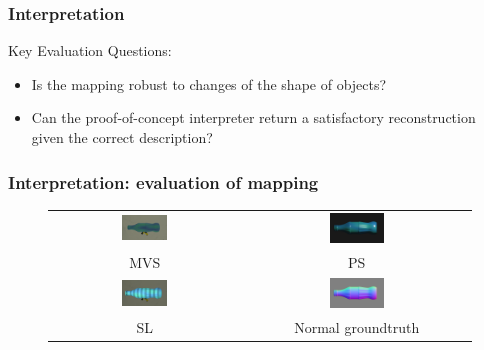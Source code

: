 \documentclass{beamer}
\begin{document}
\begin{frame}
\frametitle{Interpretation}

Key Evaluation Questions:
\begin{itemize}
\item Is the mapping robust to changes of the shape of objects?
\item Can the proof-of-concept interpreter return a satisfactory reconstruction given the correct description?
\end{itemize}

\end{frame}

\begin{frame}
\frametitle{Interpretation: evaluation of mapping}

\begin{figure}[!htbp]
\centering
\begin{tabular}{cc}
  \includegraphics[width=0.25\textwidth]{interp/synth_data/bottle/bottle_mvs}&
  \includegraphics[width=0.25\textwidth]{interp/synth_data/bottle/bottle_ps}\\
  MVS & PS\\
  \includegraphics[width=0.25\textwidth]{interp/synth_data/bottle/bottle_sl}&
  \includegraphics[width=0.25\textwidth]{interp/synth_data/bottle/bottle_ps_gt}\\
  SL & Normal groundtruth\\
\end{tabular}
\end{figure}

\end{frame}
\end{document}
